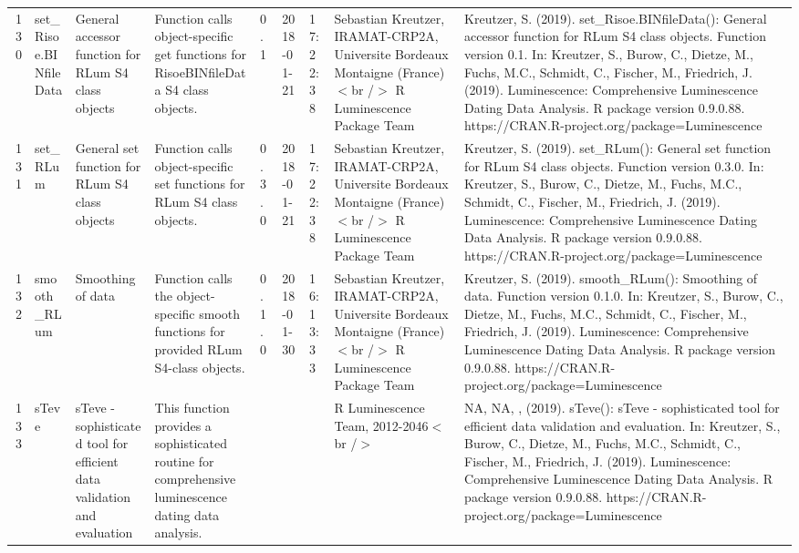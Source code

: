 \begin{table}[ht]
\begin{tabular}{rllllllll}
 \\ 
  130 & set\_Risoe.BINfileData & General accessor function for RLum S4 class objects & Function calls object-specific get functions for RisoeBINfileData S4 class objects. & 0.1 & 2018-01-21 & 17:22:38
 & Sebastian Kreutzer, IRAMAT-CRP2A, Universite Bordeaux Montaigne (France)$<$br /$>$  R Luminescence Package Team & Kreutzer, S. (2019). set\_Risoe.BINfileData(): General accessor function for RLum S4 class objects. Function version 0.1. In: Kreutzer, S., Burow, C., Dietze, M., Fuchs, M.C., Schmidt, C., Fischer, M., Friedrich, J. (2019). Luminescence: Comprehensive Luminescence Dating Data Analysis. R package version 0.9.0.88. https://CRAN.R-project.org/package=Luminescence
 \\ 
  131 & set\_RLum & General set function for RLum S4 class objects & Function calls object-specific set functions for RLum S4 class objects. & 0.3.0 & 2018-01-21 & 17:22:38
 & Sebastian Kreutzer, IRAMAT-CRP2A, Universite Bordeaux Montaigne (France)$<$br /$>$  R Luminescence Package Team & Kreutzer, S. (2019). set\_RLum(): General set function for RLum S4 class objects. Function version 0.3.0. In: Kreutzer, S., Burow, C., Dietze, M., Fuchs, M.C., Schmidt, C., Fischer, M., Friedrich, J. (2019). Luminescence: Comprehensive Luminescence Dating Data Analysis. R package version 0.9.0.88. https://CRAN.R-project.org/package=Luminescence
 \\ 
  132 & smooth\_RLum & Smoothing of data & Function calls the object-specific smooth functions for provided RLum S4-class objects. & 0.1.0 & 2018-01-30 & 16:13:33
 & Sebastian Kreutzer, IRAMAT-CRP2A, Universite Bordeaux Montaigne (France)$<$br /$>$  R Luminescence Package Team & Kreutzer, S. (2019). smooth\_RLum(): Smoothing of data. Function version 0.1.0. In: Kreutzer, S., Burow, C., Dietze, M., Fuchs, M.C., Schmidt, C., Fischer, M., Friedrich, J. (2019). Luminescence: Comprehensive Luminescence Dating Data Analysis. R package version 0.9.0.88. https://CRAN.R-project.org/package=Luminescence
 \\ 
  133 & sTeve & sTeve - sophisticated tool for efficient data validation and evaluation & This function provides a sophisticated routine for comprehensive luminescence dating data analysis. &  &  &  & R Luminescence Team, 2012-2046$<$br /$>$ & NA, NA, ,  (2019). sTeve(): sTeve - sophisticated tool for efficient data validation and evaluation. In: Kreutzer, S., Burow, C., Dietze, M., Fuchs, M.C., Schmidt, C., Fischer, M., Friedrich, J. (2019). Luminescence: Comprehensive Luminescence Dating Data Analysis. R package version 0.9.0.88. https://CRAN.R-project.org/package=Luminescence

\end{tabular}
\end{table}
